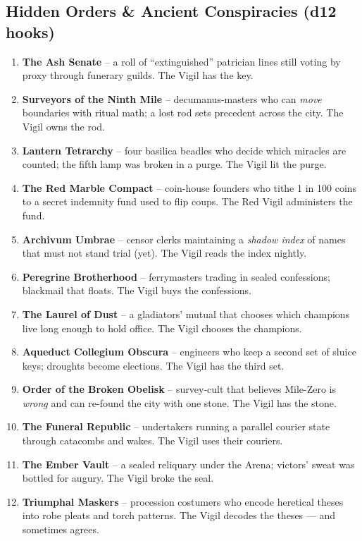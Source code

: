 \subsection*{Hidden Orders \& Ancient Conspiracies (d12 hooks)}
\label{sec:ecktoria-conspiracies}
\begin{enumerate}
  \item \textbf{The Ash Senate} -- a roll of ``extinguished'' patrician lines still voting by proxy through funerary guilds. The Vigil has the key.
  \item \textbf{Surveyors of the Ninth Mile} -- decumanus-masters who can \emph{move} boundaries with ritual math; a lost rod sets precedent across the city. The Vigil owns the rod.
  \item \textbf{Lantern Tetrarchy} -- four basilica beadles who decide which miracles are counted; the fifth lamp was broken in a purge. The Vigil lit the purge.
  \item \textbf{The Red Marble Compact} -- coin-house founders who tithe 1 in 100 coins to a secret indemnity fund used to flip coups. The Red Vigil administers the fund.
  \item \textbf{Archivum Umbrae} -- censor clerks maintaining a \emph{shadow index} of names that must not stand trial (yet). The Vigil reads the index nightly.
  \item \textbf{Peregrine Brotherhood} -- ferrymasters trading in sealed confessions; blackmail that floats. The Vigil buys the confessions.
  \item \textbf{The Laurel of Dust} -- a gladiators' mutual that chooses which champions live long enough to hold office. The Vigil chooses the champions.
  \item \textbf{Aqueduct Collegium Obscura} -- engineers who keep a second set of sluice keys; droughts become elections. The Vigil has the third set.
  \item \textbf{Order of the Broken Obelisk} -- survey-cult that believes Mile-Zero is \emph{wrong} and can re-found the city with one stone. The Vigil has the stone.
  \item \textbf{The Funeral Republic} -- undertakers running a parallel courier state through catacombs and wakes. The Vigil uses their couriers.
  \item \textbf{The Ember Vault} -- a sealed reliquary under the Arena; victors' sweat was bottled for augury. The Vigil broke the seal.
  \item \textbf{Triumphal Maskers} -- procession costumers who encode heretical theses into robe pleats and torch patterns. The Vigil decodes the theses --- and sometimes agrees.
\end{enumerate}

